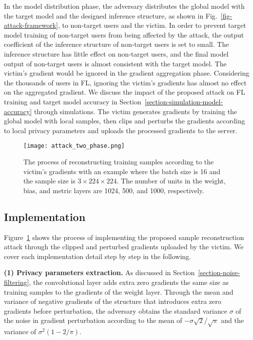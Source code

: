 \documentclass[lettersize,journal]{IEEEtran}
\begin{document}
In the model distribution phase, the adversary distributes the global model with the target model and the designed inference structure, as shown in Fig.~\ref{fig-attack-framework}, to non-target users and the victim. In order to prevent target model training of non-target users from being affected by the attack, the output coefficient of the inference structure of non-target users is set to small. The inference structure has little effect on non-target users, and the final model output of non-target users is almost consistent with the target model. The victim's gradient would be ignored in the gradient aggregation phase. Considering the thousands of users in FL, ignoring the victim's gradients has almost no effect on the aggregated gradient. We discuss the impact of the proposed attack on FL training and target model accuracy in Section~\ref{section-simulation-model-accuracy} through simulations. The victim generates gradients by training the global model with local samples, then clips and perturbs the gradients according to local privacy parameters and uploads the processed gradients to the server.

\begin{figure}
\centering
\texttt{[image: attack\_two\_phase.png]}
\caption{The process of reconstructing training samples according to the victim's gradients with an example where the batch size is 16 and the sample size is $3 \times 224 \times 224$. The number of units in the weight, bias, and metric layers are 1024, 500, and 1000, respectively.}
\label{fig-attack-flow}
\end{figure}

\subsection{Implementation}
\label{section-all-in-one-implementation}

Figure~\ref{fig-attack-flow} shows the process of implementing the proposed sample reconstruction attack through the clipped and perturbed gradients uploaded by the victim. We cover each implementation detail step by step in the following.

\textbf{(1) Privacy parameters extraction.} As discussed in Section~\ref{section-noise-filtering}, the convolutional layer adds extra zero gradients the same size as training samples to the gradients of the weight layer. Through the mean and variance of negative gradients of the structure that introduces extra zero gradients before perturbation, the adversary obtains the standard variance $\sigma$ of the noise in gradient perturbation according to the mean of $-\sigma \sqrt{2} / \sqrt{\pi}$ and the variance of $\sigma^2\left( 1 - 2/\pi\right)$.
\end{document}
